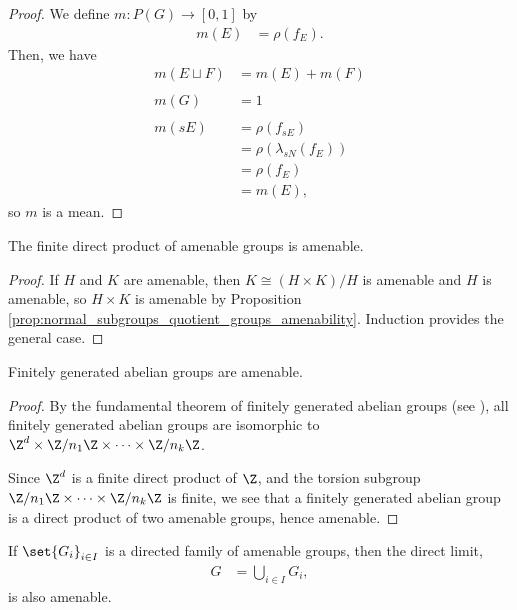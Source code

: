 \begin{proof}
  We define $m\colon P(G)\rightarrow [0,1]$ by
  \begin{align*}
    m(E) &= \rho\left(f_E\right).
  \end{align*}
  Then, we have
  \begin{align*}
    m\left(E\sqcup F\right) &= m(E) + m(F)\\
                            \\
    m\left(G\right) &= 1\\
    \\
    m\left(sE\right) &= \rho\left(f_{sE}\right)\\
                     &= \rho\left(\lambda_{sN}\left(f_{E}\right)\right)\\
                     &= \rho\left(f_E\right)\\
                     &= m(E),
  \end{align*}
  so $m$ is a mean.
\end{proof}
\begin{corollary}
  The finite direct product of amenable groups is amenable.
\end{corollary}
\begin{proof}
  If $H$ and $K$ are amenable, then $K\cong \left(H\times K\right)/H$ is amenable and $H$ is amenable, so $H\times K$ is amenable by Proposition \ref{prop:normal_subgroups_quotient_groups_amenability}. Induction provides the general case.
\end{proof}
\begin{corollary}
  Finitely generated abelian groups are amenable.
\end{corollary}
\begin{proof}
  By the fundamental theorem of finitely generated abelian groups (see \cite[158]{dummit_and_foote}), all finitely generated abelian groups are isomorphic to $\Z^{d}\times \Z/n_1\Z\times\cdots\times \Z/{n_k}\Z$.\newline

  Since $\Z^{d}$ is a finite direct product of $\Z$, and the torsion subgroup $\Z/n_1\Z\times\cdots\times \Z/n_k\Z$ is finite, we see that a finitely generated abelian group is a direct product of two amenable groups, hence amenable.
\end{proof}
\begin{corollary}
  If $\set{G_i}_{i\in I}$ is a directed family of amenable groups, then the direct limit,
  \begin{align*}
    G &= \bigcup_{i\in I}G_i,
  \end{align*}
  is also amenable.
\end{corollary}
